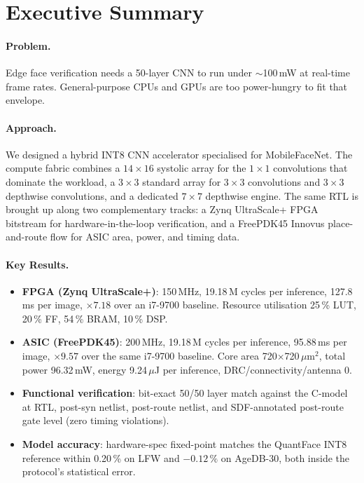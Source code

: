 \section*{Executive Summary}

\paragraph{Problem.} Edge face verification needs a 50-layer CNN to run under $\sim$100\,mW at real-time frame rates. General-purpose CPUs and GPUs are too power-hungry to fit that envelope.

\paragraph{Approach.} We designed a hybrid INT8 CNN accelerator specialised for MobileFaceNet. The compute fabric combines a $14\times16$ systolic array for the $1\times1$ convolutions that dominate the workload, a $3\times3$ standard array for $3\times3$ convolutions and $3\times3$ depthwise convolutions, and a dedicated $7\times7$ depthwise engine. The same RTL is brought up along two complementary tracks: a Zynq UltraScale+ FPGA bitstream for hardware-in-the-loop verification, and a FreePDK45 Innovus place-and-route flow for ASIC area, power, and timing data.

\paragraph{Key Results.}
\begin{itemize}[nosep]
\item \textbf{FPGA (Zynq UltraScale+)}: 150\,MHz, 19.18\,M cycles per inference, 127.8\,ms per image, $\times7.18$ over an i7-9700 baseline. Resource utilisation 25\,\% LUT, 20\,\% FF, 54\,\% BRAM, 10\,\% DSP.
\item \textbf{ASIC (FreePDK45)}: 200\,MHz, 19.18\,M cycles per inference, 95.88\,ms per image, $\times9.57$ over the same i7-9700 baseline. Core area 720$\times$720\,$\mu$m$^2$, total power 96.32\,mW, energy 9.24\,$\mu$J per inference, DRC/connectivity/antenna 0.
\item \textbf{Functional verification}: bit-exact 50/50 layer match against the C-model at RTL, post-syn netlist, post-route netlist, and SDF-annotated post-route gate level (zero timing violations).
\item \textbf{Model accuracy}: hardware-spec fixed-point matches the QuantFace INT8 reference within 0.20\,\% on LFW and $-0.12\,\%$ on AgeDB-30, both inside the protocol's statistical error.
\end{itemize}

